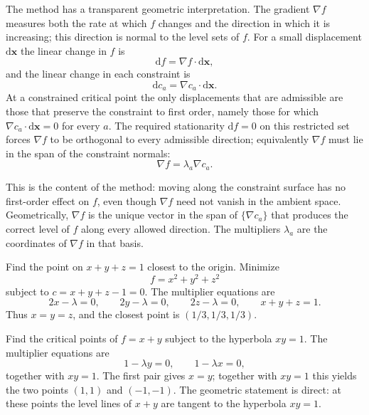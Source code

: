 The method has a transparent geometric interpretation. The gradient $\nabla f$ measures both the rate at which $f$ changes and the direction in which it is increasing; this direction is normal to the level sets of $f$. For a small displacement $\mathrm{d}\mathbf{x}$ the linear change in $f$ is
\begin{equation}
\mathrm{d}f=\nabla f\cdot\mathrm{d}\mathbf{x},
\end{equation}
and the linear change in each constraint is
\begin{equation}
\mathrm{d}c_a=\nabla c_a\cdot\mathrm{d}\mathbf{x}.
\end{equation}
At a constrained critical point the only displacements that are admissible are those that preserve the constraint to first order, namely those for which $\nabla c_a\cdot\mathrm{d}\mathbf{x}=0$ for every $a$. The required stationarity $\mathrm{d}f=0$ on this restricted set forces $\nabla f$ to be orthogonal to every admissible direction; equivalently $\nabla f$ must lie in the span of the constraint normals:
\begin{equation}
\nabla f=\lambda_a\nabla c_a.
\end{equation}

This is the content of the method: moving along the constraint surface has no first-order effect on $f$, even though $\nabla f$ need not vanish in the ambient space. Geometrically, $\nabla f$ is the unique vector in the span of $\{\nabla c_a\}$ that produces the correct level of $f$ along every allowed direction. The multipliers $\lambda_a$ are the coordinates of $\nabla f$ in that basis.

\begin{example}
Find the point on $x+y+z=1$ closest to the origin. Minimize
\begin{equation}
f=x^2+y^2+z^2
\end{equation}
subject to $c=x+y+z-1=0$. The multiplier equations are
\begin{equation}
2x-\lambda=0,
\qquad 2y-\lambda=0,
\qquad 2z-\lambda=0,
\qquad x+y+z=1.
\end{equation}
Thus $x=y=z$, and the closest point is $(1/3,1/3,1/3)$.
\end{example}

\begin{example}
Find the critical points of $f=x+y$ subject to the hyperbola $xy=1$. The multiplier equations are
\begin{equation}
1-\lambda y=0,
\qquad 1-\lambda x=0,
\end{equation}
together with $xy=1$. The first pair gives $x=y$; together with $xy=1$ this yields the two points $(1,1)$ and $(-1,-1)$. The geometric statement is direct: at these points the level lines of $x+y$ are tangent to the hyperbola $xy=1$.
\end{example}

